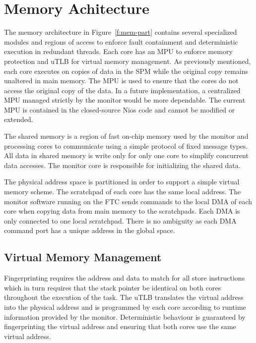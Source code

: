 

\section{Memory Achitecture}

	The memory architecture in Figure~\ref{f:mem-part} contains several specialized modules and regions of access to enforce fault containment and deterministic execution in redundant threads. 
	Each core has an MPU to enforce memory protection and uTLB for virtual memory management. 
	As previously mentioned, each core executes on copies of data in the SPM while the original copy remains unaltered in main memory. 
	The MPU is used to ensure that the cores do not access the original copy of the data. 
	In a future implementation, a centralized MPU managed strictly by the monitor would be more dependable. 
	The current MPU is contained in the closed-source Nios code and cannot be modified or extended. 

	The shared memory is a region of fast on-chip memory used by the monitor and processing cores to communicate using a simple protocol of fixed message types. 
	All data in shared memory is write only for only one core to simplify concurrent data accesses. 
	The monitor core is responsible for initializing the shared data. %

The physical address space is partitioned in order to support a simple virtual memory scheme. The scratchpad of each core has the same local address. The monitor software running on the FTC sends commands to the local DMA of each core when copying data from main memory to the scratchpads. Each DMA is only connected to one local scratchpad. There is no ambiguity as each DMA command port has a unique address in the global space. 

\subsection{Virtual Memory Management}

Fingerprinting requires the address and data to match for all store instructions which in turn requires that the stack pointer be identical on both cores throughout the execution of the task. The uTLB translates the virtual address into the physical address and is programmed by each core according to runtime information provided by the monitor. Deterministic behaviour is guaranteed by fingerprinting the virtual address and ensuring that both cores use the same virtual address. 

